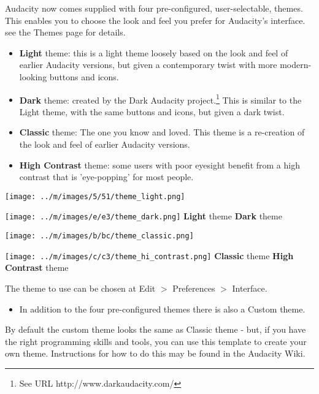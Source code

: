 \documentclass[twocolumn]{book}
\begin{document}
Audacity now comes supplied with four pre-configured, user-selectable, themes.  This enables you to choose the look and feel you prefer for Audacity's interface. see the Themes page for details.
\begin{itemize}
\item \textbf{Light} theme: this is a light theme loosely based on the look and feel of earlier Audacity versions, but given a contemporary twist with more modern-looking buttons and icons. 
\item \textbf{Dark} theme: created by the Dark Audacity project.\footnote{See URL http://www.darkaudacity.com/} This is similar to the Light theme, with the same buttons and icons, but given a dark twist.
\item \textbf{Classic} theme: The one you know and loved. This theme is a re-creation of the look and feel of earlier Audacity versions. 
\item \textbf{High Contrast} theme: some users with poor eyesight benefit from a high contrast that is 'eye-popping' for most people.
\end{itemize}



\* \* \* \* \par\texttt{[image: ../m/images/5/51/theme\_light.png]}
\* \* \* \* \par\texttt{[image: ../m/images/e/e3/theme\_dark.png]}
\* \* \* \* 
\textbf{Light} theme
\* \* \* \* 
\textbf{Dark} theme


\* \* \* \* \par\texttt{[image: ../m/images/b/bc/theme\_classic.png]}
\* \* \* \* \par\texttt{[image: ../m/images/c/c3/theme\_hi\_contrast.png]}
\* \* \* \* 
\textbf{Classic} theme
\* \* \* \* 
\textbf{High Contrast} theme



The theme to use can be chosen at Edit \mbox{$>$} Preferences \mbox{$>$} Interface.  
\begin{itemize}
\item  In addition to the four pre-configured themes there is also a Custom theme.  
\end{itemize}
 By default the custom theme looks the same as Classic theme - but, if you have the right programming skills and tools, you can use this template to create your own theme.  Instructions for how to do this may be found in the Audacity Wiki.
\end{document}
